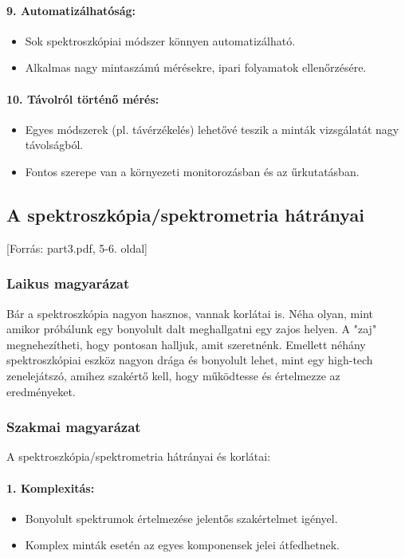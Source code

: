\documentclass[a4paper,12pt]{article}
\begin{document}
\paragraph{9. Automatizálhatóság:} \begin{itemize} \item Sok spektroszkópiai módszer könnyen automatizálható. \item Alkalmas nagy mintaszámú mérésekre, ipari folyamatok ellenőrzésére. \end{itemize}

\paragraph{10. Távolról történő mérés:} \begin{itemize} \item Egyes módszerek (pl. távérzékelés) lehetővé teszik a minták vizsgálatát nagy távolságból. \item Fontos szerepe van a környezeti monitorozásban és az űrkutatásban. \end{itemize}

\subsection{A spektroszkópia/spektrometria hátrányai} [Forrás: part3.pdf, 5-6. oldal]

\subsubsection{Laikus magyarázat} Bár a spektroszkópia nagyon hasznos, vannak korlátai is. Néha olyan, mint amikor próbálunk egy bonyolult dalt meghallgatni egy zajos helyen. A "zaj" megnehezítheti, hogy pontosan halljuk, amit szeretnénk. Emellett néhány spektroszkópiai eszköz nagyon drága és bonyolult lehet, mint egy high-tech zenelejátszó, amihez szakértő kell, hogy működtesse és értelmezze az eredményeket.

\subsubsection{Szakmai magyarázat} A spektroszkópia/spektrometria hátrányai és korlátai:

\paragraph{1. Komplexitás:} \begin{itemize} \item Bonyolult spektrumok értelmezése jelentős szakértelmet igényel. \item Komplex minták esetén az egyes komponensek jelei átfedhetnek. \end{itemize}
\end{document}
